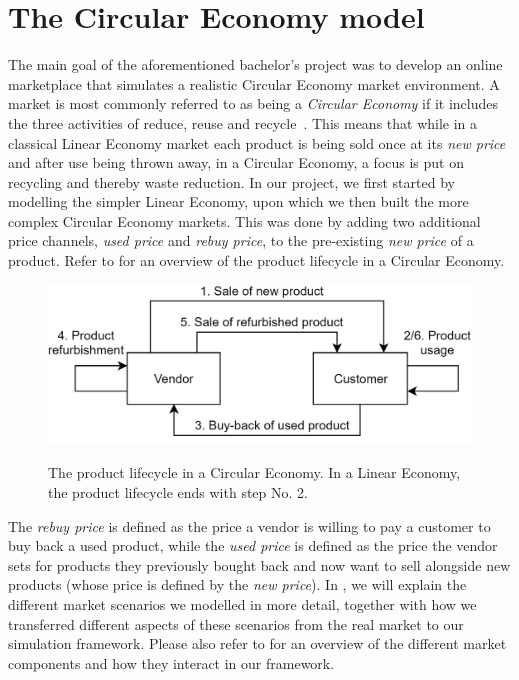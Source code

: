 \clearpage
\section{The Circular Economy model}\label{sec:CircularEconomy}

The main goal of the aforementioned bachelor's project was to develop an online marketplace that simulates a realistic Circular Economy market environment. A market is most commonly referred to as being a \emph{Circular Economy} if it includes the three activities of reduce, reuse and recycle~\cite{circularEconomyDefinition}. This means that while in a classical Linear Economy market each product is being sold once at its \emph{new price} and after use being thrown away, in a Circular Economy, a focus is put on recycling and thereby waste reduction. In our project, we first started by modelling the simpler Linear Economy, upon which we then built the more complex Circular Economy markets. This was done by adding two additional price channels, \emph{used price} and \emph{rebuy price}, to the pre-existing \emph{new price} of a product. Refer to  for an overview of the product lifecycle in a Circular Economy.

\begin{figure}[t]
	\centering
	\includegraphics[width = \textwidth]{images/product_lifecycle.png}\\
	\caption{The product lifecycle in a Circular Economy. In a Linear Economy, the product lifecycle ends with step No. 2.}\label{fig:IntroMarketDynamics}
\end{figure}

The \emph{rebuy price} is defined as the price a vendor is willing to pay a customer to buy back a used product, while the \emph{used price} is defined as the price the vendor sets for products they previously bought back and now want to sell alongside new products (whose price is defined by the \emph{new price}). In , we will explain the different market scenarios we modelled in more detail, together with how we transferred different aspects of these scenarios from the real market to our simulation framework. Please also refer to  for an overview of the different market components and how they interact in our framework.

